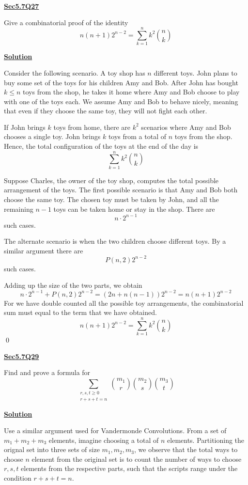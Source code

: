 \documentclass{article}
\newcommand{\new}[1]{
    \vspace{2mm}
    \noindent
    \textbf{
    \underline{#1}}
}
\newcommand{\m}{
    \cdot
}
\begin{document}
\new{Sec5.7Q27} 
Give a combinatorial proof of the identity 
\[
  n(n+1) 2^{n - 2} = \sum_{k = 1}^{n}k^2\binom{n}{k}
\]

\new{Solution}
Consider the following scenario. A toy shop has $n$ different 
toys. John plans to buy some set of the toys for his children 
Amy and Bob. After John has bought $k \leq n$ toys from the shop, 
he takes it home where Amy and Bob choose to play with one of the toys 
each. We assume Amy and Bob to behave nicely, meaning that even if they 
choose the same toy, they will not fight each other. 

If John brings $k$ toys from home, there are $k^2$ scenarios 
where Amy and Bob chooses a single toy. John brings $k$ toys from 
a total of $n$ toys from the shop. Hence, the total configuration 
of the toys at the end of the day is 
\[
    \sum_{k = 1}^n k^2 \binom{n}{k}
\]

Suppose Charles, the owner of the toy shop, computes the total possible 
arrangement of the toys. The first possible scenario is that Amy and 
Bob both choose the same toy. The chosen toy must be taken by John, 
and all the remaining $n - 1$ toys can be taken home or stay in the shop. 
There are 
\[
    n\m2^{n - 1}
\]
such cases. 

The alternate scenario is when the two children choose different 
toys. By a similar argument there are 
\[
    P(n, 2) 2^{n - 2}
\]
such cases. 

Adding up the size of the two parts, we obtain 
\[
      n\m2^{n - 1} +   P(n, 2) 2^{n - 2}
      = (2n + n(n - 1))2^{n - 2} = n(n + 1)2^{n-2}
\]
For we have double counted all the possible toy arrangements, 
the combinatorial sum must equal to the term that we have obtained. 
\[
  n(n+1) 2^{n - 2} = \sum_{k = 1}^{n}k^2\binom{n}{k}
\]
\hfill \qed

\new{Sec5.7Q29} 
Find and prove a formula for 
\[
    \sum_{\substack{r, s, t \geq 0\\r + s + t = n}}
    \binom{m_1}{r} \binom{m_2}{s} \binom{m_3}{t}
\]

\new{Solution}
Use a similar argument used for Vandermonde Convolutions. From 
a set of 
$m_1 + m_2 + m_3$ elements, imagine choosing a total of $n$ 
elements. Partitioning the orignal set into three sets of 
size $m_1, m_2, m_3$, we observe that the total ways 
to choose $n$ element from the original set is to count 
the number of ways to choose $r, s, t$ elements from the 
respective parts, such that the scripts range under 
the condition $r + s + t = n$. 
\end{document}
